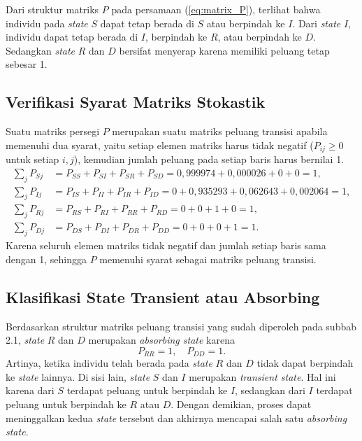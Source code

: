 \documentclass[12pt,a4paper]{article}
\numberwithin{equation}{section}
\begin{document}
Dari struktur matriks $P$ pada persamaan (\ref{eq:matrix_P}), terlihat bahwa individu pada \textit{state} $S$ dapat tetap berada di $S$ atau berpindah ke $I$. Dari \textit{state} $I$, individu dapat tetap berada di $I$, berpindah ke $R$, atau berpindah ke $D$. Sedangkan \textit{state} $R$ dan $D$ bersifat menyerap karena memiliki peluang tetap sebesar 1.

\subsection{Verifikasi Syarat Matriks Stokastik}
Suatu matriks persegi $P$ merupakan suatu matriks peluang transisi apabila memenuhi dua syarat, yaitu setiap elemen matriks harus tidak negatif ($P_{ij} \ge 0$ untuk setiap $i, j$), kemudian jumlah peluang pada setiap baris harus bernilai 1.
\begin{align*}
  \sum_j P_{Sj} &= P_{SS} + P_{SI} + P_{SR} + P_{SD} = 0{,}999974 + 0{,}000026 + 0 + 0 = 1, \\
  \sum_j P_{Ij} &= P_{IS} + P_{II} + P_{IR} + P_{ID} = 0 + 0{,}935293 + 0{,}062643 + 0{,}002064 = 1, \\
  \sum_j P_{Rj} &= P_{RS} + P_{RI} + P_{RR} + P_{RD} = 0 + 0 + 1 + 0 = 1, \\
  \sum_j P_{Dj} &= P_{DS} + P_{DI} + P_{DR} + P_{DD} = 0 + 0 + 0 + 1 = 1.
\end{align*}
Karena seluruh elemen matriks tidak negatif dan jumlah setiap baris sama dengan 1, sehingga $P$ memenuhi syarat sebagai matriks peluang transisi.

\subsection{Klasifikasi State Transient atau Absorbing}
Berdasarkan struktur matriks peluang transisi yang sudah diperoleh pada subbab 2.1, \textit{state} $R$ dan $D$ merupakan \textit{absorbing state} karena
\[
  P_{RR} = 1, \quad P_{DD} = 1.
\]
Artinya, ketika individu telah berada pada \textit{state} $R$ dan $D$ tidak dapat berpindah ke \textit{state} lainnya. Di sisi lain, \textit{state} $S$ dan $I$ merupakan \textit{transient state}. Hal ini karena dari $S$ terdapat peluang untuk berpindah ke $I$, sedangkan dari $I$ terdapat peluang untuk berpindah ke $R$ atau $D$. Dengan demikian, proses dapat meninggalkan kedua \textit{state} tersebut dan akhirnya mencapai salah satu \textit{absorbing state}.
\end{document}
